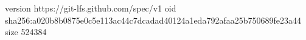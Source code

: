version https://git-lfs.github.com/spec/v1
oid sha256:a020b8b0875e0c5e113ac44c7dcadad40124a1eda792afaa25b750689fe23a44
size 524384
